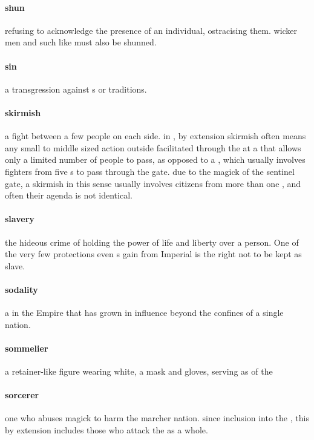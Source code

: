 \paragraph{shun} refusing to acknowledge the presence of an individual, ostracising them. wicker men and such like must also be shunned. 
\paragraph{sin} a transgression against s or traditions. 
\paragraph{skirmish} a fight between a few people on each side. in , by extension skirmish often means any small to middle sized action outside  facilitated through the  at a  that allows only a limited number of people to pass, as opposed to a , which usually involves fighters from five s to pass through the gate. due to the magick of the sentinel gate, a skirmish in this sense usually involves citizens from more than one , and often their agenda is not identical.
\paragraph{slavery} the hideous crime of holding the power of life and liberty over a person. One of the very few protections even s gain from Imperial  is the right not to be kept as slave.
\paragraph{sodality} a  in the Empire that has grown in influence beyond the confines of a single nation.
\paragraph{sommelier} a retainer-like figure wearing white, a mask and gloves, serving as  of the 
\paragraph{sorcerer} one who abuses magick to harm the marcher nation. since inclusion into the , this by extension includes those who attack the  as a whole. 
